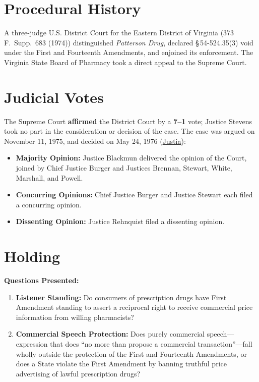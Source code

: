 \documentclass[12pt]{article}
\begin{document}
\section{Procedural History}
A three-judge U.S. District Court for the Eastern District of Virginia (373 F.\ Supp.\ 683 (1974)) distinguished \textit{Patterson Drug}, declared \S\,54-524.35(3) void under the First and Fourteenth Amendments, and enjoined its enforcement. The Virginia State Board of Pharmacy took a direct appeal to the Supreme Court.

\section{Judicial Votes}
The Supreme Court \textbf{affirmed} the District Court by a \textbf{7--1} vote; Justice Stevens took no part in the consideration or decision of the case. The case was argued on November 11, 1975, and decided on May 24, 1976 (\href{https://supreme.justia.com/cases/federal/us/425/748/}{Justia}):

\begin{itemize}
    \item \textbf{Majority Opinion:} Justice Blackmun delivered the opinion of the Court, joined by Chief Justice Burger and Justices Brennan, Stewart, White, Marshall, and Powell.
    \item \textbf{Concurring Opinions:} Chief Justice Burger and Justice Stewart each filed a concurring opinion.
    \item \textbf{Dissenting Opinion:} Justice Rehnquist filed a dissenting opinion.
\end{itemize}

\section{Holding}
\textbf{Questions Presented:}

\begin{enumerate}
  \item \textbf{Listener Standing:} Do consumers of prescription drugs have First Amendment standing to assert a reciprocal right to receive commercial price information from willing pharmacists?
  \item \textbf{Commercial Speech Protection:} Does purely commercial speech---expression that does ``no more than propose a commercial transaction''---fall wholly outside the protection of the First and Fourteenth Amendments, or does a State violate the First Amendment by banning truthful price advertising of lawful prescription drugs?
\end{enumerate}
\end{document}
